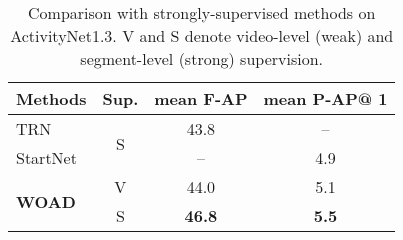 \documentclass[final]{cvpr}
\begin{document}
\begin{table}[ht]
    \centering
    \begin{tabular}{l|c||c|c}
        Methods & Sup. & mean F-AP & mean P-AP@ 1\\
        \midrule
        TRN~\cite{xu2019trn}& \multirow{2}{*}{S}& 43.8& -- \\
        StartNet~\cite{gao2019startnet}& & -- & 4.9 \\
        \midrule
        \multirow{2}{*}{\textbf{WOAD}}& V & 44.0& 5.1\\
        \cmidrule{2-4}
        & S & \textbf{46.8}& \textbf{5.5}  \\
    \end{tabular}
    \caption{Comparison with strongly-supervised methods on ActivityNet1.3. V and S denote video-level (weak) and segment-level (strong) supervision.}
    \label{tab: anet_1.3}
\end{table}
\end{document}
